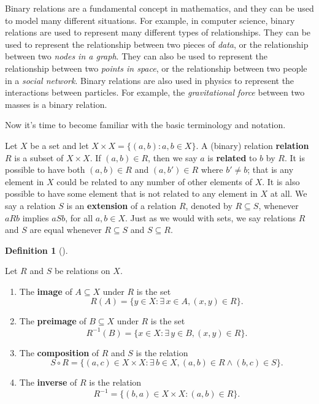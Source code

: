 \documentclass[
  letterpaper,
  10pt,
  reqno,
  twopage,
  openany]{book}
\providecommand{\tightlist}{%
  \setlength{\itemsep}{0pt}\setlength{\parskip}{0pt}}\usepackage{longtable,booktabs,array}
\theoremstyle{plain}
\theoremstyle{definition}
\theoremstyle{definition}
\newtheorem{definition}{Definition}[chapter]
\theoremstyle{definition}
\theoremstyle{plain}
\theoremstyle{plain}
\theoremstyle{remark}
\begin{document}
Binary relations are a fundamental concept in mathematics, and they can
be used to model many different situations. For example, in computer
science, binary relations are used to represent many different types of
relationships. They can be used to represent the relationship between
two pieces of \emph{data}, or the relationship between two \emph{nodes
in a graph}. They can also be used to represent the relationship between
two \emph{points in space}, or the relationship between two people in a
\emph{social network}. Binary relations are also used in physics to
represent the interactions between particles. For example, the
\emph{gravitational force} between two masses is a binary relation.

Now it's time to become familiar with the basic terminology and
notation.

Let \(X\) be a set and let \(X\times X=\{(a,b): a,b \in X\}.\) A
(binary) relation \textbf{relation} \(R\) is a subset of \(X\times X\).
If \((a,b)\in R\), then we say \(a\) is  \textbf{related}
to \(b\) by \(R\). It is possible to have both \((a,b)\in R\) and
\((a,b')\in R\) where \(b'\neq b\); that is any element in \(X\) could
be related to any number of other elements of \(X\). It is also possible
to have some element that is not related to any element in \(X\) at all.
We say a relation \(S\) is an  \textbf{extension} of a
relation \(R\), denoted by \(R\subseteq S\), whenever \(aRb\) implies
\(aSb\), for all \(a,b\in X\). Just as we would with sets, we say
relations \(R\) and \(S\) are equal whenever \(R\subseteq S\) and
\(S\subseteq R\).

\leavevmode{}%
\begin{definition}[]\label{def-basic-terminology-notation}

Let \(R\) and \(S\) be relations on \(X\).

\begin{enumerate}
\def\labelenumi{\arabic{enumi}.}
\tightlist
\item
  The  \textbf{image} of \(A\subseteq X\) under \(R\) is
  the set \[R(A)=\{y\in X : \exists \, x\in A, (x,y)\in R\}.\]
\item
  The  \textbf{preimage} of \(B\subseteq X\) under \(R\)
  is the set \[R^{-1}(B)=\{x\in X : \exists \, y\in B, (x,y)\in R\}.\]
\item
  The  \textbf{composition} of \(R\) and \(S\) is the
  relation
  \[S\circ R = \{(a,c)\in X\times X : \exists \, b\in X, (a,b)\in R \land (b,c)\in S\}.\]
\item
  The  \textbf{inverse} of \(R\) is the relation
  \[R^{-1}=\{(b,a)\in X\times X : (a,b)\in R\}.\]
\end{enumerate}

\end{definition}
\end{document}
